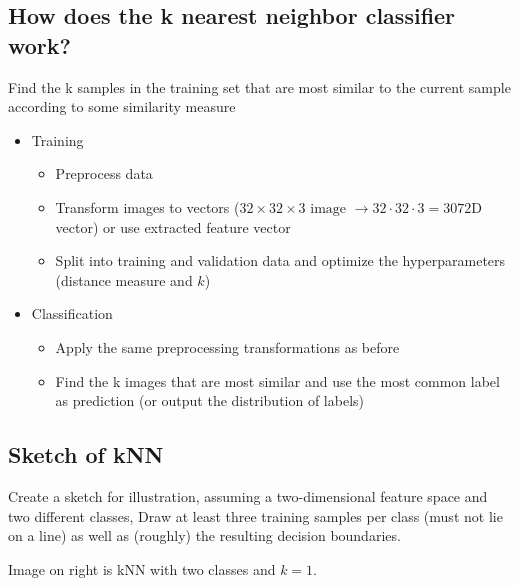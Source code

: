 \subsection{How does the k nearest neighbor classifier work?}
Find the k samples in the training set that are most similar to the current sample according to some similarity measure

\begin{itemize}
\item Training
\begin{itemize}
\item Preprocess data 
\item Transform images to vectors ($32\times 32\times 3 \text{ image }\to 32\cdot 32\cdot 3 = 3072$D vector) or use extracted feature vector
\item Split into training and validation data and optimize the hyperparameters (distance measure and $k$)
\end{itemize}
\item Classification
\begin{itemize}
\item Apply the same preprocessing  transformations as before
\item Find the k images that are most similar and use the most common label as prediction (or output the distribution of labels)
\end{itemize}
\end{itemize}

\subsection{Sketch of kNN}
\begin{minipage}{0.65\textwidth}
{Create a sketch for illustration, assuming a two-dimensional feature space and two different classes, Draw at least three training samples per class (must not lie on a line) as well as (roughly) the resulting decision boundaries.}

Image on right is kNN with two classes and $k=1$.
\end{minipage}
\begin{minipage}{0.4\textwidth}

\end{minipage}
